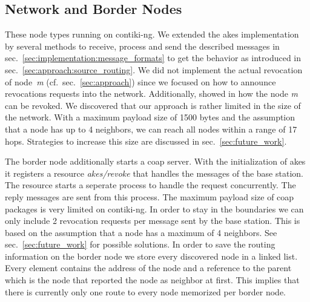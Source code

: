 \documentclass[conference]{IEEEtran}
\begin{document}
\subsection{Network and Border Nodes}\label{sec:implementation:nodes}
These node types running on contiki-ng.
We extended the \ac{akes} implementation by several methods to receive, process and send the described messages in sec.~\ref{sec:implementation:message_formats} to get the behavior as introduced in sec.~\ref{sec:approach:source_routing}.
We did not implement the actual revocation of node~\textit{m} (cf.~sec.~\ref{sec:approach}) since we focused on how to announce revocations requests into the network.
Additionally, \citeauthor{DanielWerner} showed in \cite{DanielWerner} how the node \textit{m} can be revoked.
We discovered that our approach is rather limited in the size of the network.
With a maximum payload size of 1500 bytes and the assumption that a node has up to 4 neighbors, we can reach all nodes within a range of 17 hops.
Strategies to increase this size are discussed in sec.~\ref{sec:future_work}.

The border node additionally starts a \ac{coap} server.
With the initialization of \ac{akes} it registers a resource \textit{akes/revoke} that handles the messages of the base station.
The resource starts a seperate process to handle the request concurrently. 
The reply messages are sent from this process.
The maximum payload size of \ac{coap} packages is very limited on contiki-ng.
In order to stay in the boundaries we can only include 2 revocation requests per message sent by the base station.
This is based on the assumption that a node has a maximum of 4 neighbors.
See sec.~\ref{sec:future_work} for possible solutions.
In order to save the routing information on the border node we store every discovered node in a linked list.
Every element contains the address of the node and a reference to the parent which is the node that reported the node as neighbor at first.
This implies that there is currently only one route to every node memorized per border node.
\end{document}
